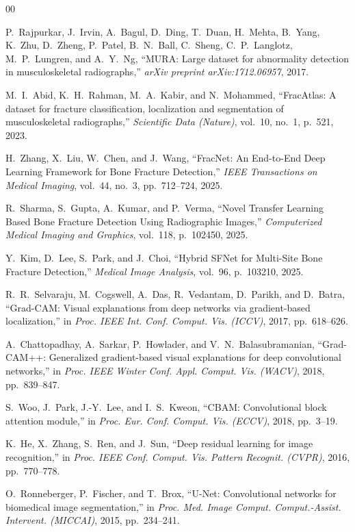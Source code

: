 \documentclass[journal]{IEEEtran}
\begin{document}
\begin{thebibliography}{00}

P.~Rajpurkar, J.~Irvin, A.~Bagul, D.~Ding, T.~Duan, H.~Mehta, B.~Yang, K.~Zhu, D.~Zheng, P.~Patel, B.~N.~Ball, C.~Sheng, C.~P.~Langlotz, M.~P.~Lungren, and A.~Y.~Ng, ``MURA: Large dataset for abnormality detection in musculoskeletal radiographs,'' \textit{arXiv preprint arXiv:1712.06957}, 2017.

M.~I.~Abid, K.~H.~Rahman, M.~A.~Kabir, and N.~Mohammed, ``FracAtlas: A dataset for fracture classification, localization and segmentation of musculoskeletal radiographs,'' \textit{Scientific Data (Nature)}, vol.~10, no.~1, p.~521, 2023.

H.~Zhang, X.~Liu, W.~Chen, and J.~Wang, ``FracNet: An End-to-End Deep Learning Framework for Bone Fracture Detection,'' \textit{IEEE Transactions on Medical Imaging}, vol.~44, no.~3, pp.~712--724, 2025.

R.~Sharma, S.~Gupta, A.~Kumar, and P.~Verma, ``Novel Transfer Learning Based Bone Fracture Detection Using Radiographic Images,'' \textit{Computerized Medical Imaging and Graphics}, vol.~118, p.~102450, 2025.

Y.~Kim, D.~Lee, S.~Park, and J.~Choi, ``Hybrid SFNet for Multi-Site Bone Fracture Detection,'' \textit{Medical Image Analysis}, vol.~96, p.~103210, 2025.

R.~R.~Selvaraju, M.~Cogswell, A.~Das, R.~Vedantam, D.~Parikh, and D.~Batra, ``Grad-CAM: Visual explanations from deep networks via gradient-based localization,'' in \textit{Proc. IEEE Int. Conf. Comput. Vis. (ICCV)}, 2017, pp.~618--626.

A.~Chattopadhay, A.~Sarkar, P.~Howlader, and V.~N.~Balasubramanian, ``Grad-CAM++: Generalized gradient-based visual explanations for deep convolutional networks,'' in \textit{Proc. IEEE Winter Conf. Appl. Comput. Vis. (WACV)}, 2018, pp.~839--847.

S.~Woo, J.~Park, J.-Y.~Lee, and I.~S.~Kweon, ``CBAM: Convolutional block attention module,'' in \textit{Proc. Eur. Conf. Comput. Vis. (ECCV)}, 2018, pp.~3--19.

K.~He, X.~Zhang, S.~Ren, and J.~Sun, ``Deep residual learning for image recognition,'' in \textit{Proc. IEEE Conf. Comput. Vis. Pattern Recognit. (CVPR)}, 2016, pp.~770--778.

O.~Ronneberger, P.~Fischer, and T.~Brox, ``U-Net: Convolutional networks for biomedical image segmentation,'' in \textit{Proc. Med. Image Comput. Comput.-Assist. Intervent. (MICCAI)}, 2015, pp.~234--241.

\end{thebibliography}
\end{document}
